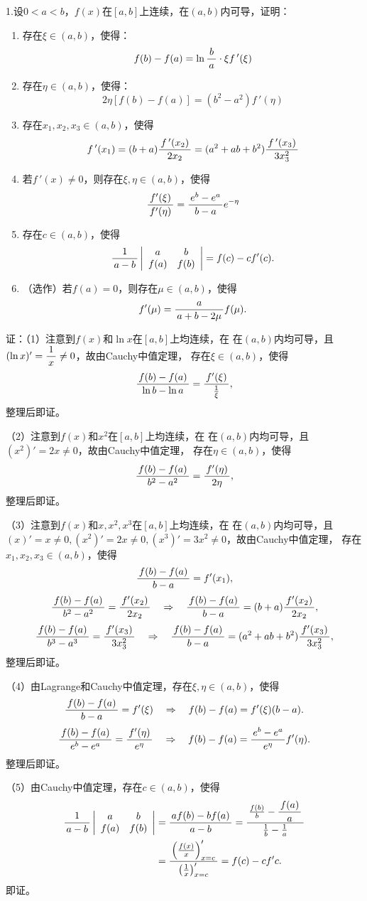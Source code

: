1.设$0<a<b$，$f(x)$在$[a,b]$上连续，在$(a,b)$内可导，证明：
\begin{enumerate}[(1)]
  \setlength{\itemindent}{1cm}
  \item 存在$\xi\in(a,b)$，使得：
	$$f(b)-f(a)=\ln\displaystyle\frac{\,{b}\,}{\,{a}\,}\cdot \xi f\,'(\xi)$$
  \item 存在$\eta\in(a,b)$，使得：
    $$2\eta[f(b)-f(a)]=(b^2-a^2)f\,'(\eta)$$
  \item 存在$x_1,x_2,x_3\in(a,b)$，使得
	$$f\,'(x_1)=(b+a)\displaystyle\frac{\,{f\,'(x_2)}\,}{\,{2x_2}\,}=(a^2+ab+b^2)
	\displaystyle\frac{\,{f\,'(x_3)}\,}{\,{3x_3^2}\,}$$ 
  \item 若$f\,'(x)\ne 0$，则存在$\xi,\eta\in(a,b)$，使得
	$$\displaystyle\frac{\,{f'(\xi)}\,}{\,{f'(\eta)}\,}=\displaystyle\frac{\,{e^b-e^a}\,}{\,{b-a}\,}e^{-\eta}$$
  \item 存在$c\in(a,b)$，使得
	$$\displaystyle\frac{\,{1}\,}{\,{a-b}\,}\left|\begin{array}{cc}
	a & b\\ f(a) & f(b)
	\end{array}\right|=f(c)-cf'(c).$$
  \item （选作）若$f(a)=0$，则存在$\mu\in(a,b)$，使得
  $$f'(\mu)=\displaystyle\frac{\,{a}\,}{\,{a+b-2\mu}\,}f(\mu).$$
\end{enumerate}

证：（1）注意到$f(x)$和$\ln x$在$[a,b]$上均连续，在
在$(a,b)$内均可导，且$(\ln x)'=\displaystyle\frac{\,{1}\,}{\,{x}\,}\ne 0$，故由Cauchy中值定理，
存在$\xi\in(a,b)$，使得
$$\displaystyle\frac{\,{f(b)-f(a)}\,}{\,{\ln b-\ln a}\,}=\displaystyle\frac{\,{f'(\xi)}\,}{\,{\frac1{\xi}}\,},$$
整理后即证。

（2）注意到$f(x)$和$x^2$在$[a,b]$上均连续，在
在$(a,b)$内均可导，且$(x^2)'=2x\ne 0$，故由Cauchy中值定理，
存在$\eta\in(a,b)$，使得
$$\displaystyle\frac{\,{f(b)-f(a)}\,}{\,{b^2-a^2}\,}=\displaystyle\frac{\,{f'(\eta)}\,}{\,{2\eta}\,},$$
整理后即证。

（3）注意到$f(x)$和$x,x^2,x^3$在$[a,b]$上均连续，在
在$(a,b)$内均可导，且$(x)'=x\ne 0,(x^2)'=2x\ne 0,
(x^3)'=3x^2\ne 0$，故由Cauchy中值定理，
存在$x_1,x_2,x_3\in(a,b)$，使得
$$\displaystyle\frac{\,{f(b)-f(a)}\,}{\,{b-a}\,}=f'(x_1),$$
$$\displaystyle\frac{\,{f(b)-f(a)}\,}{\,{b^2-a^2}\,}=\displaystyle\frac{\,{f'(x_2)}\,}{\,{2x_2}\,}
\quad\Rightarrow\quad
\displaystyle\frac{\,{f(b)-f(a)}\,}{\,{b-a}\,}=(b+a)\displaystyle\frac{\,{f'(x_2)}\,}{\,{2x_2}\,},$$
$$\displaystyle\frac{\,{f(b)-f(a)}\,}{\,{b^3-a^3}\,}=\displaystyle\frac{\,{f'(x_3)}\,}{\,{3x_3^2}\,}
\quad\Rightarrow\quad
\displaystyle\frac{\,{f(b)-f(a)}\,}{\,{b-a}\,}=(a^2+ab+b^2)\displaystyle\frac{\,{f'(x_3)}\,}{\,{3x_3^2}\,},$$
整理后即证。

（4）由Lagrange和Cauchy中值定理，存在$\xi,\eta\in(a,b)$，使得
$$\displaystyle\frac{\,{f(b)-f(a)}\,}{\,{b-a}\,}=f'(\xi)
\quad\Rightarrow\quad
f(b)-f(a)=f'(\xi)(b-a).$$
$$\displaystyle\frac{\,{f(b)-f(a)}\,}{\,{e^b-e^a}\,}=\displaystyle\frac{\,{f'(\eta)}\,}{\,{e^{\eta}}\,}
\quad\Rightarrow\quad
f(b)-f(a)=\displaystyle\frac{\,{e^b-e^a}\,}{\,{e^{\eta}}\,}f'(\eta).$$
整理后即证。

（5）由Cauchy中值定理，存在$c\in(a,b)$，使得
\begin{align*}
	\displaystyle\frac{\,{1}\,}{\,{a-b}\,}\left|\begin{array}{cc}
	a & b\\ f(a) & f(b)
	\end{array}\right|
	&=\displaystyle\frac{\,{af(b)-bf(a)}\,}{\,{a-b}\,}=\displaystyle\frac{\,{\frac{f(b)}b-\displaystyle\frac{\,{f(a)}\,}{\,{a}\,}}\,}{\,{\frac1b-\frac1a}\,}\\
	&=\displaystyle\frac{\,{\left(\frac{f(x)}x\right)'_{x=c}}\,}{\,{\left(\frac1x\right)'_{x=c}}\,}
	=f(c)-cf'c.
\end{align*}
即证。


